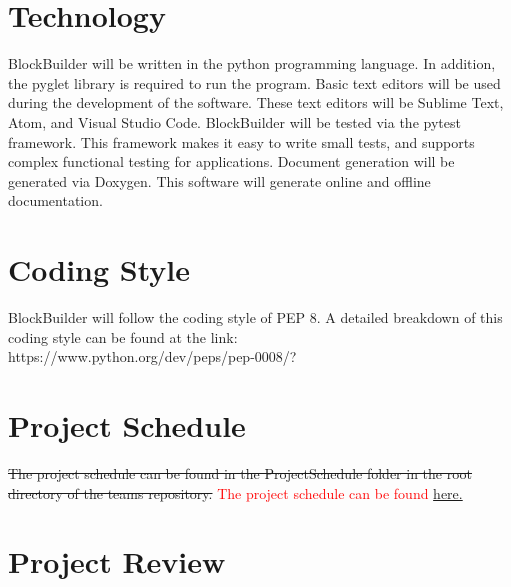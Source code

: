 \documentclass{article}
\begin{document}
\section{Technology}

BlockBuilder will be written in the python programming language. In addition, the pyglet library is required to run the program. Basic text editors will be used during the development of the software. These text editors will be Sublime Text, Atom, and Visual Studio Code. BlockBuilder will be tested via the pytest framework. This framework makes it easy to write small tests, and supports complex functional testing for applications. Document generation will be generated via Doxygen. This software will generate online and offline documentation.


\section{Coding Style}
BlockBuilder will follow the coding style of PEP 8. A detailed breakdown of this coding style can be found at the link:\\ https://www.python.org/dev/peps/pep-0008/?

\section{Project Schedule}
\sout{The project schedule can be found in the ProjectSchedule folder in the root directory of the teams repository.} \textcolor{red}{The project schedule can be found } \href{../../ProjectSchedule/Project\_Schedule.pdf}{here.}

\section{Project Review}
\end{document}
